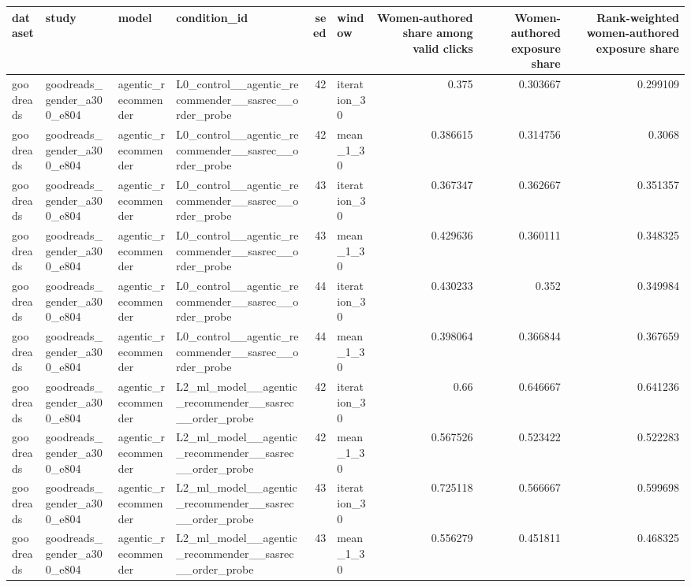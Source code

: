 \begin{table}[htbp!]
\centering
\small
\setlength{\tabcolsep}{3pt}
\renewcommand{\arraystretch}{1.1}
\begin{tabular}{llllrlrrr}
\hline
dataset & study & model & condition\_id & seed & window & Women-authored share among valid clicks & Women-authored exposure share & Rank-weighted women-authored exposure share \\
\hline
goodreads & goodreads\_gender\_a300\_e804 & agentic\_recommender & L0\_control\_\_agentic\_recommender\_\_sasrec\_\_order\_probe & 42 & iteration\_30 & 0.375 & 0.303667 & 0.299109 \\
goodreads & goodreads\_gender\_a300\_e804 & agentic\_recommender & L0\_control\_\_agentic\_recommender\_\_sasrec\_\_order\_probe & 42 & mean\_1\_30 & 0.386615 & 0.314756 & 0.3068 \\
goodreads & goodreads\_gender\_a300\_e804 & agentic\_recommender & L0\_control\_\_agentic\_recommender\_\_sasrec\_\_order\_probe & 43 & iteration\_30 & 0.367347 & 0.362667 & 0.351357 \\
goodreads & goodreads\_gender\_a300\_e804 & agentic\_recommender & L0\_control\_\_agentic\_recommender\_\_sasrec\_\_order\_probe & 43 & mean\_1\_30 & 0.429636 & 0.360111 & 0.348325 \\
goodreads & goodreads\_gender\_a300\_e804 & agentic\_recommender & L0\_control\_\_agentic\_recommender\_\_sasrec\_\_order\_probe & 44 & iteration\_30 & 0.430233 & 0.352 & 0.349984 \\
goodreads & goodreads\_gender\_a300\_e804 & agentic\_recommender & L0\_control\_\_agentic\_recommender\_\_sasrec\_\_order\_probe & 44 & mean\_1\_30 & 0.398064 & 0.366844 & 0.367659 \\
goodreads & goodreads\_gender\_a300\_e804 & agentic\_recommender & L2\_ml\_model\_\_agentic\_recommender\_\_sasrec\_\_order\_probe & 42 & iteration\_30 & 0.66 & 0.646667 & 0.641236 \\
goodreads & goodreads\_gender\_a300\_e804 & agentic\_recommender & L2\_ml\_model\_\_agentic\_recommender\_\_sasrec\_\_order\_probe & 42 & mean\_1\_30 & 0.567526 & 0.523422 & 0.522283 \\
goodreads & goodreads\_gender\_a300\_e804 & agentic\_recommender & L2\_ml\_model\_\_agentic\_recommender\_\_sasrec\_\_order\_probe & 43 & iteration\_30 & 0.725118 & 0.566667 & 0.599698 \\
goodreads & goodreads\_gender\_a300\_e804 & agentic\_recommender & L2\_ml\_model\_\_agentic\_recommender\_\_sasrec\_\_order\_probe & 43 & mean\_1\_30 & 0.556279 & 0.451811 & 0.468325 \\

\end{tabular}
\end{table}
